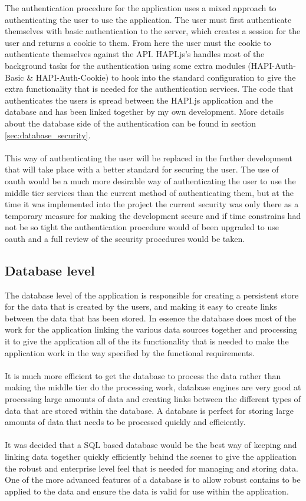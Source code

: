 The authentication procedure for the application uses a mixed approach to authenticating the user to use the application. The user must first authenticate themselves with basic authentication to the server, which creates a session for the user and returns a cookie to them. From here the user must the cookie to authenticate themselves against the API. HAPI.js's handles most of the background tasks for the authentication using some extra modules (HAPI-Auth-Basic \& HAPI-Auth-Cookie) to hook into the standard configuration to give the extra functionality that is needed for the authentication services. The code that authenticates the users is spread between the HAPI.js application and the database and has been linked together by my own development. More details about the database side of the authentication can be found in section \ref{sec:database_security}.\\
\\
This way of authenticating the user will be replaced in the further development that will take place with a better standard for securing the user. The use of oauth would be a much more desirable way of authenticating the user to use the middle tier services than the current method of authenticating them, but at the time it was implemented into the project the current security was only there as a temporary measure for making the development secure and if time constrains had not be so tight the authentication procedure would of been upgraded to use oauth and a full review of the security procedures would be taken.


\subsection{Database level}

The database level of the application is responsible for creating a persistent store for the data that is created by the users, and making it easy to create links between the data that has been stored. In essence the database does most of the work for the application linking the various data sources together and processing it to give the application all of the its functionality that is needed to make the application work in the way specified by the functional requirements.\\
\\
It is much more efficient to get the database to process the data rather than making the middle tier do the processing work, database engines are very good at processing large amounts of data and creating links between the different types of data that are stored within the database. A database is perfect for storing large amounts of data that needs to be processed quickly and efficiently.\\
\\
It was decided that a SQL based database would be the best way of keeping and linking data together quickly efficiently behind the scenes to give the application the robust and enterprise level feel that is needed for managing and storing data. One of the more advanced features of a database is to allow robust contains to be applied to the data and ensure the data is valid for use within the application.

